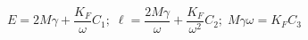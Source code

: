\begin{equation}
\label{3equations}
E=2M\gamma +\frac{K_F}{\omega}C_1;\;\ell =\frac{2M\gamma}{\omega}+\frac{K_F}{\omega^2}C_2;\;M\gamma \omega =K_FC_3
\end{equation} 

